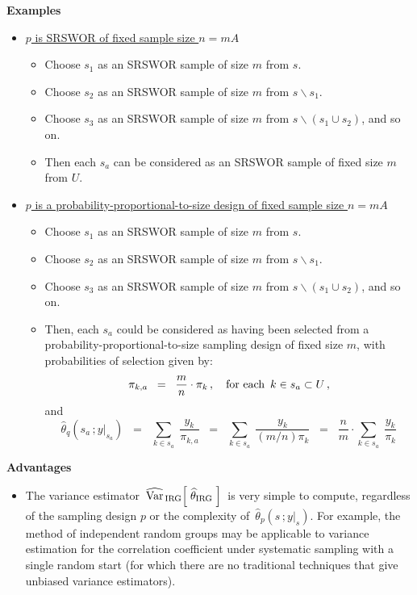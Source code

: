 \vskip 0.5cm
\noindent
\textbf{Examples}
\begin{itemize}
\item
	\underline{$p$ is SRSWOR of fixed sample size $n = mA$}
	\begin{itemize}
	\item
		Choose $s_{1}$ as an SRSWOR sample of size $m$ from $s$.
	\item
		Choose $s_{2}$ as an SRSWOR sample of size $m$ from $s \backslash s_{1}$.
	\item
		Choose $s_{3}$ as an SRSWOR sample of size $m$ from $s \backslash (s_{1} \cup s_{2})$, and so on.
	\item
		Then each $s_{a}$ can be considered as an SRSWOR sample of fixed size $m$ from $U$.
	\end{itemize}
\item
	\underline{$p$ is a probability-proportional-to-size design of fixed sample size $n = mA$}
	\begin{itemize}
	\item
		Choose $s_{1}$ as an SRSWOR sample of size $m$ from $s$.
	\item
		Choose $s_{2}$ as an SRSWOR sample of size $m$ from $s \backslash s_{1}$.
	\item
		Choose $s_{3}$ as an SRSWOR sample of size $m$ from $s \backslash (s_{1} \cup s_{2})$, and so on.
	\item
		Then, each $s_{a}$ could be considered as having been selected
		from a probability-proportional-to-size sampling design of fixed size $m$,
		with probabilities of selection given by:
		\begin{equation*}
		\pi_{k,a} \;\; = \;\; \dfrac{m}{n} \cdot \pi_{k}\,,
		\quad
		\textnormal{for each \,$k \in s_{a} \subset U$}\,,
		\end{equation*}
		and
		\begin{equation*}
		\widehat{\theta}_{q}(s_{a}\,;y\vert_{s_{a}})
		\;\; = \;\;
			\underset{k \in s_{a}}{\sum}\;\dfrac{y_{k}}{\pi_{k,a}}
		\;\; = \;\;
			\underset{k \in s_{a}}{\sum}\;\dfrac{y_{k}}{(m/n)\pi_{k}}
		\;\; = \;\;
			\dfrac{n}{m}\cdot\underset{k \in s_{a}}{\sum}\;\dfrac{y_{k}}{\pi_{k}}
		\end{equation*}
	\end{itemize}
\end{itemize}

\vskip 0.5cm
\noindent
\textbf{Advantages}
\begin{itemize}
\item
	The variance estimator
	\,$\widehat{\textnormal{Var}}_{\,\textnormal{IRG}}\!\left[\;\widehat{\theta}_{\textnormal{IRG}}\;\right]$\,
	is very simple to compute, regardless of the sampling design $p$ or
	the complexity of \,$\widehat{\theta}_{p}(s\,;y\vert_{s})$.
	For example, the method of independent random groups may be applicable to variance
	estimation for the correlation coefficient under systematic sampling with a single random start
	(for which there are no traditional techniques that give unbiased variance estimators).
\end{itemize}

